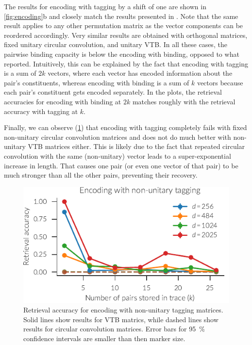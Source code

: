 The results for encoding with tagging by a shift of one are shown in \cref{fig:encoding}b and closely match the results presented in \textcite{recchia2015}.
Note that the same result applies to any other permutation matrix as the vector components can be reordered accordingly.
Very similar results are obtained with orthogonal matrices, fixed unitary circular convolution, and unitary VTB\@.
In all these cases, the pairwise binding capacity is below the encoding with binding, opposed to what \textcite{recchia2015} reported.
Intuitively, this can be explained by the fact that encoding with tagging is a sum of $2k$ vectors, where each vector has encoded information about the pair's constituents, whereas encoding with binding is a sum of $k$ vectors because each pair's constituent gets encoded separately.
In the plots, the retrieval accuracies for encoding with binding at $2k$ matches roughly with the retrieval accuracy with tagging at $k$.

Finally, we can observe (\cref{fig:encoding-nonunitary-tagging}) that encoding with tagging completely fails with fixed non-unitary circular convolution matrices and does not do much better with non-unitary VTB matrices either.
This is likely due to the fact that repeated circular convolution with the same (non-unitary) vector leads to a super-exponential increase in length.
That causes one pair (or even one vector of that pair) to be much stronger than all the other pairs, preventing their recovery.
\begin{figure}
    \centering
    \includegraphics{figures/encoding-nonunitary-tagging}
    \caption[Retrieval accuracy of encoding with non-unitary tagging matrices]{Retrieval accuracy for encoding with non-unitary tagging matrices. Solid lines show results for VTB matrics, while dashed lines show results for circular convolution matrices. Error bars for \SI{95}{\percent} confidence intervals are smaller than then marker size.}\label{fig:encoding-nonunitary-tagging}
\end{figure}

